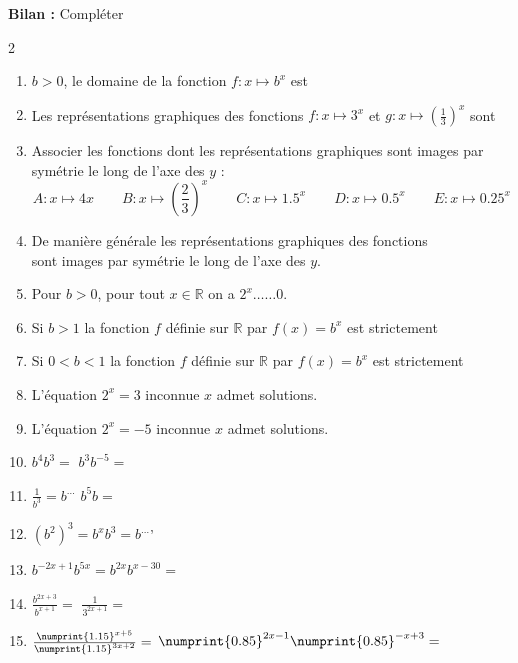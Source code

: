 \documentclass[main.tex]{subfiles}
\begin{document}
\textbf{Bilan :} Compléter 
\begin{spacing}{2}
	\begin{enumerate}[leftmargin=*,label={}]
		\item $b>0$, le domaine de la fonction $f\colon x\mapsto b^x$ est \dotfill 
		\item Les représentations graphiques des fonctions $f\colon x\mapsto 3^x$ et $g\colon x\mapsto \left(\frac{1}{3}\right)^x$ sont \dotfill 
		\item Associer les fonctions dont les représentations graphiques sont images par symétrie le long de l'axe des $y$ :
		\setlength{\abovedisplayskip}{3pt}
		\setlength{\belowdisplayskip}{3pt}
			$$A\colon x\mapsto 4x \qquad
			B\colon x\mapsto \left(\frac{2}{3}\right)^x\qquad
			C\colon x\mapsto 1.5^x\qquad
			D\colon x\mapsto 0.5^x\qquad
			E\colon x\mapsto 0.25^x
			$$
		\item De manière générale les représentations graphiques des fonctions \dotfill \\
		sont images par symétrie le long de l'axe des $y$. 
		\item Pour $b>0$, pour tout $x\in\mathbb{R}$ on a $2^x\ldots \ldots 0$.
		\item Si $b>1$ la fonction $f$ définie sur $\mathbb{R}$ par $f(x)=b^x$ est strictement \dotfill  
		\item Si $0<b<1$ la fonction $f$ définie sur $\mathbb{R}$ par $f(x)=b^x$ est strictement \dotfill 
		\item L'équation $2^x=3$ inconnue $x$ admet \dotfill solutions.
		\item L'équation $2^x=-5$ inconnue $x$ admet \dotfill solutions.
		\item $b^4b^3=$ \dotfill $b^3b^{-5}=$\dotfill
		\item $\frac{1}{b^3}=b^{\ldots}$\dotfill
		  $b^5b=$\dotfill 
		  \item $(b^2)^3=$\dotfill $b^xb^3=b^{\ldots}$'\dotfill 
		\item  $b^{-2x+1}b^{5x}=$\dotfill  $b^{2x}b^{x-30}=$\dotfill
		\item $\frac{b^{2x+3}}{b^{x+1}}=$\dotfill 
		$\frac{1}{3^{2x+1}}=$\dotfill 
		\item $\frac{\numprint{1.15}^{x+5}}{\numprint{1.15}^{3x+2}}=$\dotfill 
		$\numprint{0.85}^{2x-1}\numprint{0.85}^{-x+3}=$\dotfill 
	\end{enumerate}
\end{spacing}

%
\newpage 
{}  
\pagestyle{scrheadings} %
\onehalfspacing 
\vspace{-2mm}
\end{document}
